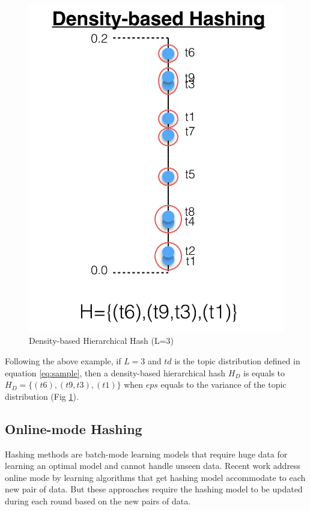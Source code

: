 \begin{figure}[t]\centering
\includegraphics[scale=0.35]{density-hash.png}
\caption{Density-based Hierarchical Hash (L=3)}
\label{fig:density_hash}
\end{figure}

Following the above example, if $L=3$ and $td$ is the topic distribution defined in equation \ref{eq:sample}, then a density-based hierarchical hash $H_{D}$ is equals to $H_{D}=\{(t6),(t9,t3),(t1)\}$ when $eps$ equals to the variance of the topic distribution (Fig \ref{fig:density_hash}).


\subsection{Online-mode Hashing}
\label{sec:comparison-onlineHashing}

Hashing methods are batch-mode learning models that require huge data for learning an optimal model and cannot handle unseen data. Recent work address online mode by learning algorithms \citep{Huang2018} that get hashing model accommodate to each new pair of data. But these approaches require the hashing model to be updated during each round based on the new pairs of data.

